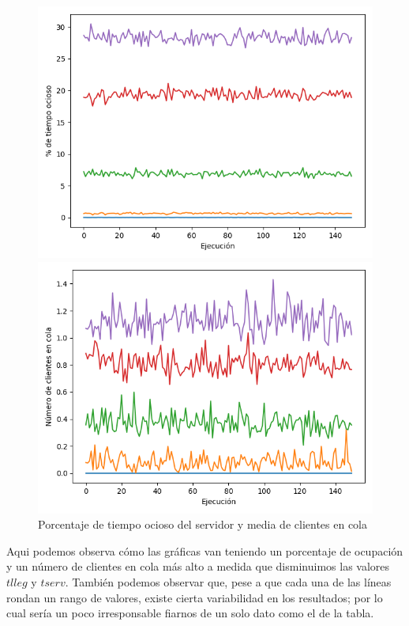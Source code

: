 \documentclass[11pt,a4paper]{report}
\begin{document}
\begin{figure}[H]
\centering
\begin{minipage}{0.5\textwidth}
  \centering
  \includegraphics[scale=0.4]{img/incremento-fijo-ocioso.png}
\end{minipage}%
\begin{minipage}{0.5\textwidth}
  \centering
  \includegraphics[scale=0.4]{img/incremento-fijo-cola.png}
\end{minipage}
\caption{Porcentaje de tiempo ocioso del servidor y media de clientes en cola}
\end{figure}

Aqui podemos observa cómo las gráficas van teniendo un porcentaje de ocupación y un número de clientes en cola más alto a medida que disminuimos las valores $tlleg$
y $tserv$. También podemos observar que, pese a que cada una de las líneas rondan un rango de valores, existe cierta variabilidad en los resultados; por lo cual sería
un poco irresponsable fiarnos de un solo dato como el de la tabla.
\end{document}
